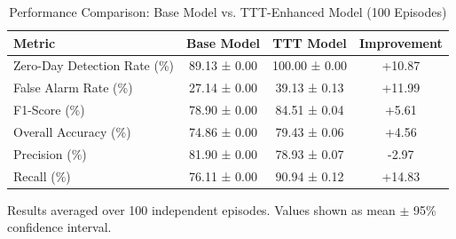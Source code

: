 \begin{table}[htbp]
\centering
\caption{Performance Comparison: Base Model vs. TTT-Enhanced Model (100 Episodes)}
\label{tab:performance}
\begin{tabular}{lccc}
\hline
Metric & Base Model & TTT Model & Improvement \\
\hline
Zero-Day Detection Rate (\%) & 89.13 ± 0.00 & 100.00 ± 0.00 & +10.87 \\
False Alarm Rate (\%) & 27.14 ± 0.00 & 39.13 ± 0.13 & +11.99 \\
F1-Score (\%) & 78.90 ± 0.00 & 84.51 ± 0.04 & +5.61 \\
Overall Accuracy (\%) & 74.86 ± 0.00 & 79.43 ± 0.06 & +4.56 \\
Precision (\%) & 81.90 ± 0.00 & 78.93 ± 0.07 & -2.97 \\
Recall (\%) & 76.11 ± 0.00 & 90.94 ± 0.12 & +14.83 \\
\hline
\end{tabular}
\begin{tablenotes}
\small
\item Results averaged over 100 independent episodes. Values shown as mean $\pm$ 95\% confidence interval.
\end{tablenotes}
\end{table}
